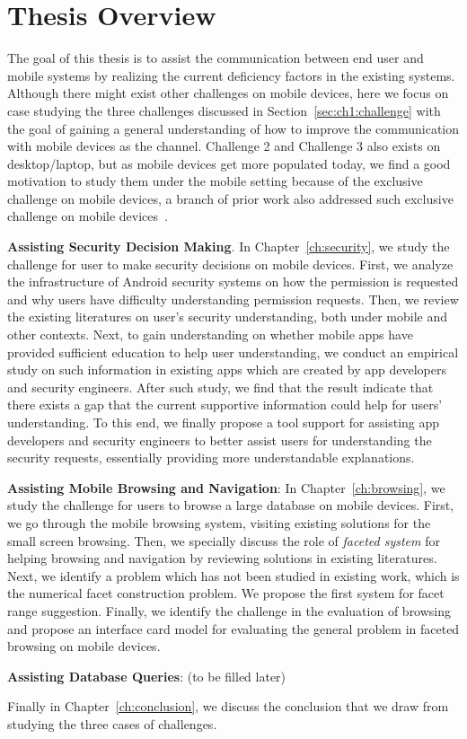 \section{Thesis Overview}

The goal of this thesis is to assist the communication between end user and mobile systems by realizing the current deficiency factors in the existing systems. Although there might exist other challenges on mobile devices, here we focus on case studying the three challenges discussed in Section~\ref{sec:ch1:challenge} with the goal of gaining a general understanding of how to improve the communication with mobile devices as the channel. Challenge 2 and Challenge 3 also exists on desktop/laptop, but as mobile devices get more populated today, we find a good motivation to study them under the mobile setting because of the exclusive challenge on mobile devices, a branch of prior work also addressed such exclusive challenge on mobile devices~\cite{popescu2003towards,zhang2017information}. 

\textbf{Assisting Security Decision Making}. In Chapter~\ref{ch:security}, we study the challenge for user to make security decisions on mobile devices. First, we analyze the infrastructure of Android security systems on how the permission is requested and why users have difficulty understanding permission requests. Then, we review the existing literatures on user's security understanding, both under mobile and other contexts. Next, to gain understanding on whether mobile apps have provided sufficient education to help user understanding, we conduct an empirical study on such information in existing apps which are created by app developers and security engineers. After such study, we find that the result indicate that there exists a gap that the current supportive information could help for users' understanding. To this end, we finally propose a tool support for assisting app developers and security engineers to better assist users for understanding the security requests, essentially providing more understandable explanations. 

\textbf{Assisting Mobile Browsing and Navigation}: In Chapter~\ref{ch:browsing}, we study the challenge for users to browse a large database on mobile devices. First, we go through the mobile browsing system, visiting existing solutions for the small screen browsing. Then, we specially discuss the role of \textit{faceted system} for helping browsing and navigation by reviewing solutions in existing literatures. Next, we identify a problem which has not been studied in existing work, which is the numerical facet construction problem. We propose the first system for facet range suggestion. Finally, we identify the challenge in the evaluation of browsing and propose an interface card model for evaluating the general problem in faceted browsing on mobile devices. 

\textbf{Assisting Database Queries}: (to be filled later)

Finally in Chapter~\ref{ch:conclusion}, we discuss the conclusion that we draw from studying the three cases of challenges. 